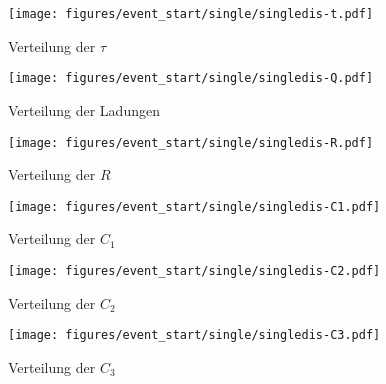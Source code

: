 \begin{figure}[htbp]
    \centering
    \begin{minipage}[t]{0.47\textwidth}
      \centering
      \texttt{[image: figures/event\_start/single/singledis-t.pdf]}
      \caption{Verteilung der \(\tau\)}
      \label{fig:multiple_histo_tau}
    \end{minipage}
 \begin{minipage}[t]{0.47\textwidth}
      \centering
      \texttt{[image: figures/event\_start/single/singledis-Q.pdf]}
      \caption{Verteilung der Ladungen}
      \label{fig:multiple_histo_charge}
  \end{minipage}
  \hfill
    \begin{minipage}[t]{0.47\textwidth}
      \centering
      \texttt{[image: figures/event\_start/single/singledis-R.pdf]}
      \caption{Verteilung der \(R\)}
      \label{fig:multiple_histo_R}
    \end{minipage}
 \begin{minipage}[t]{0.47\textwidth}
      \centering
      \texttt{[image: figures/event\_start/single/singledis-C1.pdf]}
      \caption{Verteilung der \(C_1\)}
      \label{fig:multiple_histo_c1}
  \end{minipage}
  \hfill
    \begin{minipage}[t]{0.47\textwidth}
      \centering
      \texttt{[image: figures/event\_start/single/singledis-C2.pdf]}
      \caption{Verteilung der \(C_2\)}
      \label{fig:multiple_histo_c2}
    \end{minipage}
 \begin{minipage}[t]{0.47\textwidth}
      \centering
      \texttt{[image: figures/event\_start/single/singledis-C3.pdf]}
      \caption{Verteilung der \(C_3\)}
      \label{fig:multiple_histo_c3}
  \end{minipage}
\end{figure}




